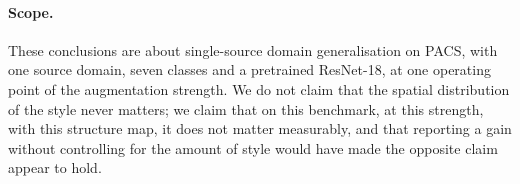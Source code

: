 \paragraph{Scope.}
These conclusions are about single-source domain generalisation on PACS,
with one source domain, seven classes and a pretrained ResNet-18, at one
operating point of the augmentation strength. We do not claim that the
spatial distribution of the style never matters; we claim that on this
benchmark, at this strength, with this structure map, it does not matter
measurably, and that reporting a gain without controlling for the amount
of style would have made the opposite claim appear to hold.

